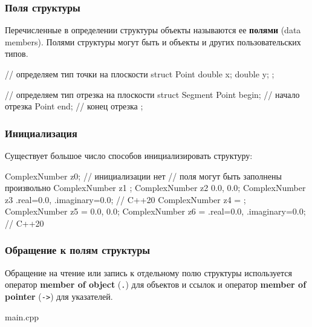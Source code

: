 \documentclass[compress, 8pt]{beamer}
\begin{document}
\begin{frame}[fragile]

    \frametitle{Поля структуры}

    Перечисленные в определении структуры объекты называются ее
    \textbf{полями}\footnotemark{} (data members).
    Полями структуры могут быть и объекты и других пользовательских типов.


    \begin{myinplacelisting}[minted language=cpp]
// определяем тип точки на плоскости
struct Point {
    double x;
    double y;
};

// определяем тип отрезка на плоскости
struct Segment {
    Point begin;    // начало отрезка
    Point end;      // конец отрезка
};
    \end{myinplacelisting}

\end{frame}

\begin{frame}[fragile]

    \frametitle{Инициализация}

    Существует большое число способов инициализировать структуру:

    \begin{myinplacelisting}[minted language=cpp]
ComplexNumber z0;   // инициализации нет
                    // поля могут быть заполнены произвольно
ComplexNumber z1 {};
ComplexNumber z2 {0.0, 0.0};
ComplexNumber z3 {.real=0.0, .imaginary=0.0}; // C++20
ComplexNumber z4 = {};
ComplexNumber z5 = {0.0, 0.0};
ComplexNumber z6 = {.real=0.0, .imaginary=0.0}; // C++20
    \end{myinplacelisting}

\end{frame}

\begin{frame}[fragile]

    \frametitle{Обращение к полям структуры}

    \hfill\break
    Обращение на чтение или запись к отдельному полю структуры используется оператор
    \textbf{member of object} (\verb|.|) для объектов и ссылок и оператор
    \textbf{member of pointer} (\verb|->|) для указателей\footnotemark{}.


        {main.cpp}

\end{frame}
\end{document}
